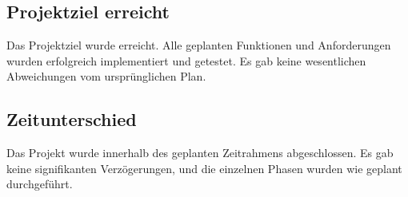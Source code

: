 \documentclass[a4paper,12pt,ngerman]{sphinxmanual}
\begin{document}
\subsection{Projektziel erreicht}
\label{\detokenize{sections/fazit:projektziel-erreicht}}
\sphinxAtStartPar
Das Projektziel wurde erreicht. Alle geplanten Funktionen und Anforderungen wurden erfolgreich implementiert und getestet. Es gab keine wesentlichen Abweichungen vom ursprünglichen Plan.


\subsection{Zeitunterschied}
\label{\detokenize{sections/fazit:zeitunterschied}}
\sphinxAtStartPar
Das Projekt wurde innerhalb des geplanten Zeitrahmens abgeschlossen. Es gab keine signifikanten Verzögerungen, und die einzelnen Phasen wurden wie geplant durchgeführt.
\end{document}
